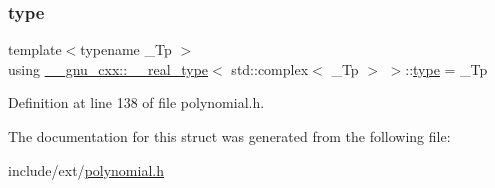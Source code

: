 \subsubsection{\texorpdfstring{type}{type}}
{\footnotesize\ttfamily template$<$typename \+\_\+\+Tp $>$ \\
using \hyperlink{struct____gnu__cxx_1_1____real__type}{\+\_\+\+\_\+gnu\+\_\+cxx\+::\+\_\+\+\_\+real\+\_\+type}$<$ std\+::complex$<$ \+\_\+\+Tp $>$ $>$\+::\hyperlink{struct____gnu__cxx_1_1____real__type_3_01std_1_1complex_3_01__Tp_01_4_01_4_a038d9970ff97c1b3eeb53f5eb08fdfe1}{type} =  \+\_\+\+Tp}



Definition at line 138 of file polynomial.\+h.



The documentation for this struct was generated from the following file\+:\begin{DoxyCompactItemize}
\item 
include/ext/\hyperlink{polynomial_8h}{polynomial.\+h}\end{DoxyCompactItemize}
